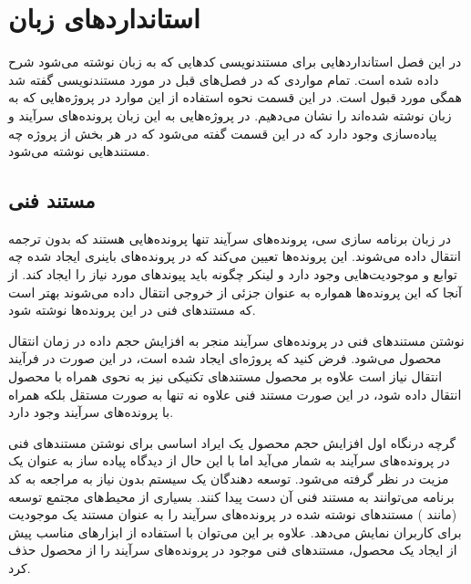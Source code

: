 \chapter{استانداردهای زبان }

در این فصل استانداردهایی برای مستندنویسی کدهایی که به زبان  نوشته
می‌شود شرح داده شده است. تمام مواردی که در فصل‌های قبل در مورد مستندنویسی گفته
شد همگی مورد قبول است. در این قسمت نحوه استفاده از این موارد در پروژه‌هایی که به
زبان   نوشته شده‌اند را نشان می‌دهیم. در پروژه‌هایی به این زبان
پرونده‌های سرآیند و پیاده‌سازی وجود دارد که در این قسمت گفته می‌شود که در هر بخش
از پروژه چه مستندهایی نوشته می‌شود.

\section{مستند فنی}

در زبان برنامه سازی سی، پرونده‌های سرآیند تنها پرونده‌هایی هستند که بدون ترجمه
انتقال داده می‌شوند. این پرونده‌ها تعیین می‌کند که در پرونده‌های باینری ایجاد
شده چه توابع و موجودیت‌هایی وجود دارد و لینکر چگونه باید پیوندهای مورد نیاز را
ایجاد کند. از آنجا که این پرونده‌ها همواره به عنوان جزئی از خروجی انتقال داده
می‌شوند بهتر است که مستندهای فنی در این پرونده‌ها نوشته شود.

نوشتن مستندهای فنی در پرونده‌های سرآیند منجر به افزایش حجم داده در زمان انتقال
محصول می‌شود. فرض کنید که پروژه‌ای ایجاد شده است، در این صورت در فرآیند انتقال
نیاز است علاوه بر محصول مستندهای تکنیکی نیز به نحوی همراه با محصول انتقال داده
شود، در این صورت مستند فنی علاوه نه تنها به صورت مستقل بلکه همراه با پرونده‌های
سرآیند وجود دارد.

گرچه درنگاه اول افزایش حجم محصول یک ایراد اساسی برای نوشتن مستندهای فنی در
پرونده‌های سرآیند به شمار می‌آید اما با این حال از دیدگاه پیاده ساز به عنوان یک
مزیت در نظر گرفته می‌شود. توسعه دهندگان یک سیستم بدون نیاز به مراجعه به کد
برنامه می‌توانند به مستند فنی آن دست پیدا کنند. بسیاری از محیط‌های مجتمع توسعه
(مانند ) مستندهای نوشته شده در پرونده‌های سرآیند را به عنوان مستند
یک موجودیت برای کاربران نمایش می‌دهد. علاوه بر این می‌توان با استفاده از ابزارهای
مناسب پیش از ایجاد یک محصول، مستندهای فنی موجود در پرونده‌های سرآیند را از محصول
حذف کرد.

